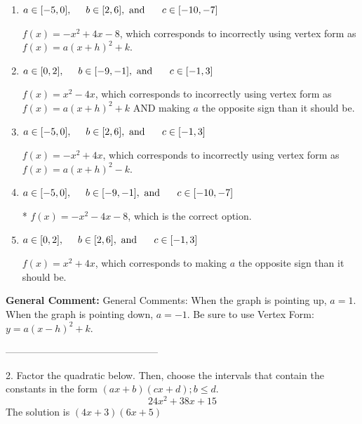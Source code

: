\documentclass{extbook}[14pt]
\begin{document}
\begin{enumerate}[label=\Alph*.] 
\item $ a \in [-5, 0], \hspace*{5mm} b \in [2, 6], \text{ and } \hspace*{5mm} c \in [-10, -7] $ 

 $f(x)=-x^{2} +4 x -8$, which corresponds to incorrectly using vertex form as $f(x) = a(x+h)^2+k$. 
\item $ a \in [0, 2], \hspace*{5mm} b \in [-9, -1], \text{ and } \hspace*{5mm} c \in [-1, 3] $ 

 $f(x)=x^{2} -4 x$, which corresponds to incorrectly using vertex form as $f(x) = a(x+h)^2+k$ AND making $a$ the opposite sign than it should be. 
\item $ a \in [-5, 0], \hspace*{5mm} b \in [2, 6], \text{ and } \hspace*{5mm} c \in [-1, 3] $ 

 $f(x)=-x^{2} +4 x$, which corresponds to incorrectly using vertex form as $f(x) = a(x+h)^2 - k$. 
\item $ a \in [-5, 0], \hspace*{5mm} b \in [-9, -1], \text{ and } \hspace*{5mm} c \in [-10, -7] $ 

 * $f(x)=-x^{2} -4 x -8$, which is the correct option. 
\item $ a \in [0, 2], \hspace*{5mm} b \in [2, 6], \text{ and } \hspace*{5mm} c \in [-1, 3] $ 

 $f(x)=x^{2} +4 x$, which corresponds to making $a$ the opposite sign than it should be. 
\end{enumerate} 
 
\textbf{General Comment:} General Comments: When the graph is pointing up, $a=1$. When the graph is pointing down, $a=-1$. Be sure to use Vertex Form: $y = a(x-h)^2+k$. 

-----------------------------------------------

2. Factor the quadratic below. Then, choose the intervals that contain the constants in the form $(ax+b)(cx+d); b \leq d.$
\[ 24x^{2} +38 x + 15 \] 
The solution is $ (4x + 3)(6x + 5) $ 
\end{document}

